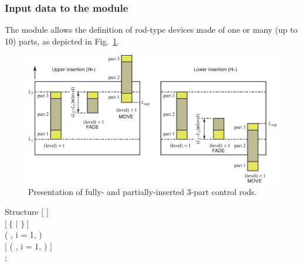 \vskip 0.2cm

\subsubsection{Input data to the  module}\label{sect:devstr}

The  module allows the definition of rod-type devices made of one or many (up to 10) parts,
as depicted in Fig.~\ref{fig:rod}.

\begin{figure}[h!]
  \begin{center}
    \includegraphics[scale=0.7]{Figures/rod.eps} 
\caption{Presentation of fully- and partially-inserted 3-part control rods.}\label{fig:rod}
  \end{center}
\end{figure}

\begin{DataStructure}{Structure }
$[$   $]$\\
  $[~\{$  $|$  $\}~]$ \\
( ,  i = 1,  ) \\
$[$      ( ,  i = 1,  ) $]$ \\
;
\end{DataStructure}

